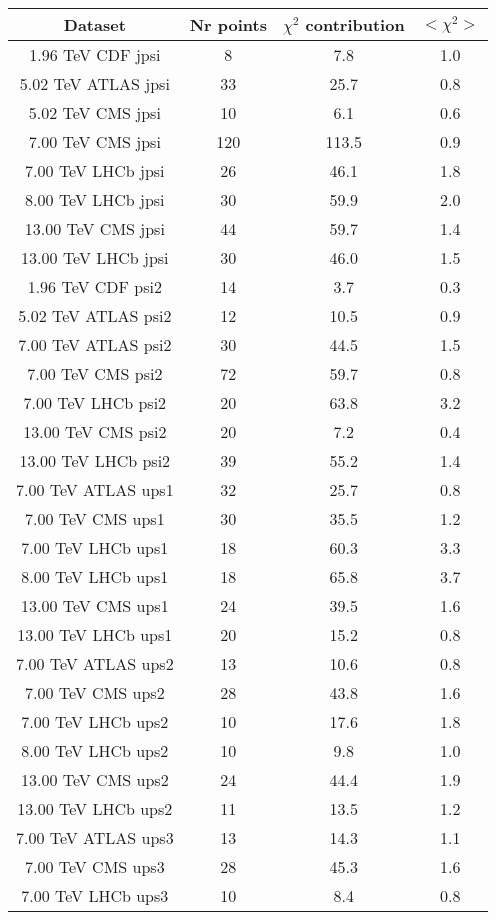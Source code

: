 \begin{table}[h!]
\centering
\begin{tabular}{c|c|c|c}
Dataset & Nr points & $\chi^2$ contribution & $<\chi^2>$ \\
\hline
1.96 TeV CDF jpsi & 8 & 7.8 & 1.0 \\
5.02 TeV ATLAS jpsi & 33 & 25.7 & 0.8 \\
5.02 TeV CMS jpsi & 10 & 6.1 & 0.6 \\
7.00 TeV CMS jpsi & 120 & 113.5 & 0.9 \\
7.00 TeV LHCb jpsi & 26 & 46.1 & 1.8 \\
8.00 TeV LHCb jpsi & 30 & 59.9 & 2.0 \\
13.00 TeV CMS jpsi & 44 & 59.7 & 1.4 \\
13.00 TeV LHCb jpsi & 30 & 46.0 & 1.5 \\
1.96 TeV CDF psi2 & 14 & 3.7 & 0.3 \\
5.02 TeV ATLAS psi2 & 12 & 10.5 & 0.9 \\
7.00 TeV ATLAS psi2 & 30 & 44.5 & 1.5 \\
7.00 TeV CMS psi2 & 72 & 59.7 & 0.8 \\
7.00 TeV LHCb psi2 & 20 & 63.8 & 3.2 \\
13.00 TeV CMS psi2 & 20 & 7.2 & 0.4 \\
13.00 TeV LHCb psi2 & 39 & 55.2 & 1.4 \\
7.00 TeV ATLAS ups1 & 32 & 25.7 & 0.8 \\
7.00 TeV CMS ups1 & 30 & 35.5 & 1.2 \\
7.00 TeV LHCb ups1 & 18 & 60.3 & 3.3 \\
8.00 TeV LHCb ups1 & 18 & 65.8 & 3.7 \\
13.00 TeV CMS ups1 & 24 & 39.5 & 1.6 \\
13.00 TeV LHCb ups1 & 20 & 15.2 & 0.8 \\
7.00 TeV ATLAS ups2 & 13 & 10.6 & 0.8 \\
7.00 TeV CMS ups2 & 28 & 43.8 & 1.6 \\
7.00 TeV LHCb ups2 & 10 & 17.6 & 1.8 \\
8.00 TeV LHCb ups2 & 10 & 9.8 & 1.0 \\
13.00 TeV CMS ups2 & 24 & 44.4 & 1.9 \\
13.00 TeV LHCb ups2 & 11 & 13.5 & 1.2 \\
7.00 TeV ATLAS ups3 & 13 & 14.3 & 1.1 \\
7.00 TeV CMS ups3 & 28 & 45.3 & 1.6 \\
7.00 TeV LHCb ups3 & 10 & 8.4 & 0.8 \\

\end{tabular}
\end{table}
